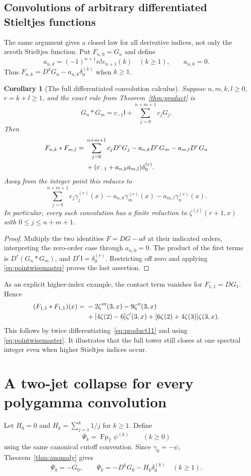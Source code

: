 \documentclass[11pt]{article}
\numberwithin{equation}{section}
\newtheorem{corollary}[theorem]{Corollary}
\theoremstyle{definition}
\theoremstyle{remark}
\DeclareMathOperator{\Fp}{Fp}
\newcommand{\T}{\mathbb T}
\newcommand{\Id}{\mathsf I}
\begin{document}
\subsection{Convolutions of arbitrary differentiated Stieltjes functions}
The same argument gives a closed law for all derivative indices, not
only the zeroth Stieltjes function. Put $F_{n,0}=G_n$ and define
\[
 a_{n,k}=(-1)^{n+1}n!e_{n+1}(k)\quad(k\ge1),\qquad a_{n,0}=0.
\]
Thus $F_{n,k}=D^kG_n-a_{n,k}\delta_0^{(k)}$ when $k\ge1$.

\begin{corollary}[The full differentiated convolution calculus]
\label{cor:fulltower}
Suppose $n,m,k,l\ge0$, $r=k+l\ge1$, and the exact rule from
Theorem~\ref{thm:product} is
\[
 G_n*G_m=c_{-1}\Id+\sum_{j=0}^{n+m+1}c_jG_j.
\]
Then
\begin{align}
 F_{n,k}*F_{m,l}={}&\sum_{j=0}^{n+m+1}c_jD^rG_j
             -a_{n,k}D^rG_m-a_{m,l}D^rG_n\label{eq:fulltower}\\
 &+(c_{-1}+a_{n,k}a_{m,l})\delta_0^{(r)}.\notag
\end{align}
Away from the integer point this reduces to
\[
 \sum_{j=0}^{n+m+1}c_j\gamma_j^{(r)}(x)
          -a_{n,k}\gamma_m^{(r)}(x)-a_{m,l}\gamma_n^{(r)}(x).
\]
In particular, every such convolution has a finite reduction to
$\zeta^{(j)}(r+1,x)$ with $0\le j\le n+m+1$.
\end{corollary}
\begin{proof}
Multiply the two identities $F=D G-a\delta$ at their indicated
orders, interpreting the zero-order case through $a_{n,0}=0$.
The product of the first terms is $D^r(G_n*G_m)$, and
$D^r\Id=\delta_0^{(r)}$. Restricting off zero and applying
\eqref{eq:pointwisemaster} proves the last assertion.
\end{proof}

As an explicit higher-index example, the contact term vanishes for
$F_{1,1}=DG_1$. Hence
\begin{align}
 (F_{1,1}*F_{1,1})(x)
 ={}&-2\zeta'''(3,x)-9\zeta''(3,x)\label{eq:gamma1primepair}\\
 &+[4\zeta(2)-6]\zeta'(3,x)
   +[6\zeta(2)+4\zeta(3)]\zeta(3,x).\notag
\end{align}
This follows by twice differentiating~\eqref{eq:product11} and using
\eqref{eq:pointwisemaster}. It illustrates that the full tower still
closes at one spectral integer even when higher Stieltjes indices occur.

\section{A two-jet collapse for every polygamma convolution}
\label{sec:poly}
Let $H_0=0$ and $H_k=\sum_{j=1}^k1/j$ for $k\ge1$. Define
\[
 \Psi_k=\Fp_{\T}\psi^{(k)}\qquad(k\ge0)
\]
using the same canonical cutoff convention. Since $\gamma_0=-\psi$,
Theorem~\ref{thm:anomaly} gives
\begin{equation}\label{eq:PsiD}
 \Psi_0=-G_0,\qquad
 \Psi_k=-D^kG_0-H_k\delta_0^{(k)}\quad(k\ge1).
\end{equation}
\end{document}
